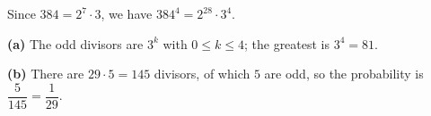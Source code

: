 Since $384=2^7\cdot3$, we have $384^4=2^{28}\cdot3^4$.

\textbf{(a)} The odd divisors are $3^k$ with $0\le k\le4$; the greatest is $3^4=\boxed{81}$.

\textbf{(b)} There are $29\cdot5=145$ divisors, of which $5$ are odd, so the probability is $\dfrac5{145}=\boxed{\dfrac1{29}}$.
